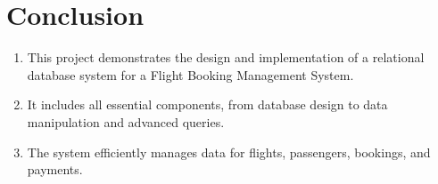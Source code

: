 \documentclass[14pt,a4paper]{extarticle}
\begin{document}
\newpage

\section{Conclusion}

\begin{enumerate}
    \item This project demonstrates the design and implementation of a relational database system for a Flight Booking Management System.
    \item It includes all essential components, from database design to data manipulation and advanced queries.
    \item The system efficiently manages data for flights, passengers, bookings, and payments.
\end{enumerate}
\end{document}
